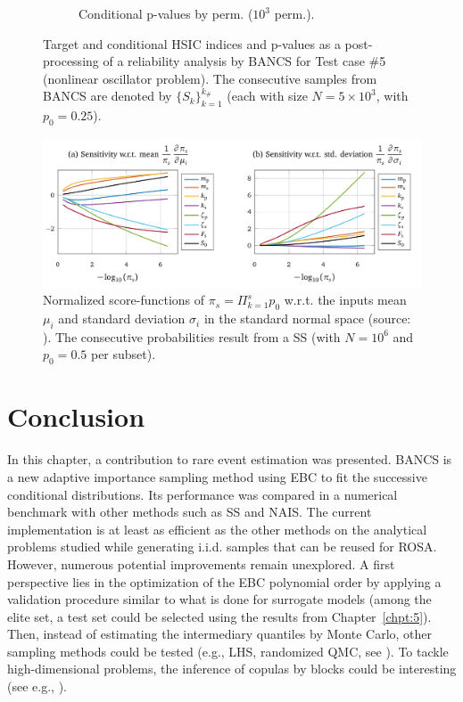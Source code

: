 \begin{figure}
\begin{subfigure}[b]{0.48\linewidth}
        \caption{Conditional p-values by perm. ($10^3$ perm.).}
    \end{subfigure}
    \caption{Target and conditional HSIC indices and p-values as a post-processing of a reliability analysis by BANCS for Test case \#5 (nonlinear oscillator problem). 
    The consecutive samples from BANCS are denoted by $\{S_k\}_{k=1}^{k_\#}$ (each with size $N=5\times10^3$, with $p_0=0.25$).}
    \label{fig:rosa_oscillator}
\end{figure}


\begin{figure}
    \centering
    \includegraphics[width=0.9\linewidth]{part3/figures/BANCS/score_function_HDR_JMB.png}
    \caption{Normalized score-functions of $\pi_s = \Pi_{k=1}^s p_0$ w.r.t. the inputs mean $\mu_i$ and standard deviation $\sigma_i$ in the standard normal space (source: \citealp[p.54]{bourinet_2018}). 
            The consecutive probabilities result from a SS (with $N=10^6$ and $p_0=0.5$ per subset).}
    \label{fig:score_functions_oscillator}
\end{figure}



\section{Conclusion}

In this chapter, a contribution to rare event estimation was presented. 
BANCS is a new adaptive importance sampling method using EBC to fit the successive conditional distributions. 
Its performance was compared in a numerical benchmark with other methods such as SS and NAIS. 
The current implementation is at least as efficient as the other methods on the analytical problems studied while generating i.i.d. samples that can be reused for ROSA. 
However, numerous potential improvements remain unexplored. 
A first perspective lies in the optimization of the EBC polynomial order by applying a validation procedure similar to what is done for surrogate models (among the elite set, a test set could be selected using the results from Chapter~\ref{chpt:5}). 
Then, instead of estimating the intermediary quantiles by Monte Carlo, other sampling methods could be tested (e.g., LHS, randomized QMC, see \citealp{tuffin_2019}). 
To tackle high-dimensional problems, the inference of copulas by blocks could be interesting (see e.g., \citealp{lasserre_2022}).

